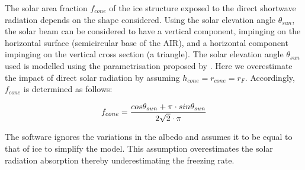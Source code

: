 \documentclass[utf8]{frontiersSCNS}
\begin{document}
The solar area fraction $f_{cone}$ of the ice structure exposed to the direct shortwave radiation depends on the
shape considered. Using the solar elevation angle $\theta_{sun}$, the solar beam can be considered to have a
vertical component, impinging on the horizontal surface (semicircular base of the AIR), and a horizontal
component impinging on the vertical cross section (a triangle). The solar elevation angle $\theta_{sun}$ used is
modelled using the parametrisation proposed by \cite{Woolf_1968}. Here we overestimate the impact of direct
solar radiation by assuming $h_{cone} = r_{cone} = r_{F}$. Accordingly, $f_{cone}$ is determined as follows:

\begin{equation}
	\begin{split}
		f_{cone}& =\frac{ cos \theta_{sun} + \pi \cdot sin \theta_{sun} }{2\sqrt{2} \cdot \pi }\\
	\end{split}
	\label{ eqn:f_{cone}}
\end{equation}

The software ignores the variations in the albedo and assumes it to be equal to that of ice to simplify the
model. This assumption overestimates the solar radiation absorption thereby underestimating the freezing rate.

 
\end{document}
